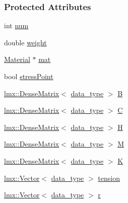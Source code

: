 \subsubsection*{Protected Attributes}
\begin{DoxyCompactItemize}
\item 
int \hyperlink{classmknix_1_1_gauss_point_a47cb3d74f927e150168f2052553cbea8}{num}
\item 
double \hyperlink{classmknix_1_1_gauss_point_af75968d801b5fcc70f253c0032fc6bdc}{weight}
\item 
\hyperlink{classmknix_1_1_material}{Material} $\ast$ \hyperlink{classmknix_1_1_gauss_point_a6a5bbd79657a22ea5e23e9a2b791a004}{mat}
\item 
bool \hyperlink{classmknix_1_1_gauss_point_ad2cf2a84109ea9cb94bebd48aebfcff0}{stress\+Point}
\item 
\hyperlink{classlmx_1_1_dense_matrix}{lmx\+::\+Dense\+Matrix}$<$ \hyperlink{namespacemknix_a16be4b246fbf2cceb141e3a179111020}{data\+\_\+type} $>$ \hyperlink{classmknix_1_1_gauss_point_a986b9346095f1f4ed3542c5420818ad8}{B}
\item 
\hyperlink{classlmx_1_1_dense_matrix}{lmx\+::\+Dense\+Matrix}$<$ \hyperlink{namespacemknix_a16be4b246fbf2cceb141e3a179111020}{data\+\_\+type} $>$ \hyperlink{classmknix_1_1_gauss_point_a1ddd5b8c0d24fce9868b3336c8d5868c}{C}
\item 
\hyperlink{classlmx_1_1_dense_matrix}{lmx\+::\+Dense\+Matrix}$<$ \hyperlink{namespacemknix_a16be4b246fbf2cceb141e3a179111020}{data\+\_\+type} $>$ \hyperlink{classmknix_1_1_gauss_point_a22eef5f154a559db9c1ae1e299765631}{H}
\item 
\hyperlink{classlmx_1_1_dense_matrix}{lmx\+::\+Dense\+Matrix}$<$ \hyperlink{namespacemknix_a16be4b246fbf2cceb141e3a179111020}{data\+\_\+type} $>$ \hyperlink{classmknix_1_1_gauss_point_a6148d055483a3dc8d1f87b570e6189e1}{M}
\item 
\hyperlink{classlmx_1_1_dense_matrix}{lmx\+::\+Dense\+Matrix}$<$ \hyperlink{namespacemknix_a16be4b246fbf2cceb141e3a179111020}{data\+\_\+type} $>$ \hyperlink{classmknix_1_1_gauss_point_ae7978e2c7f9e6289a137e3da640f7c09}{K}
\item 
\hyperlink{classlmx_1_1_vector}{lmx\+::\+Vector}$<$ \hyperlink{namespacemknix_a16be4b246fbf2cceb141e3a179111020}{data\+\_\+type} $>$ \hyperlink{classmknix_1_1_gauss_point_ace15b3e57fc0aa5622496c37b5defd1d}{tension}
\item 
\hyperlink{classlmx_1_1_vector}{lmx\+::\+Vector}$<$ \hyperlink{namespacemknix_a16be4b246fbf2cceb141e3a179111020}{data\+\_\+type} $>$ \hyperlink{classmknix_1_1_gauss_point_ab18708b00a667157083c5a9e3d9807b4}{r}

\end{DoxyCompactItemize}
